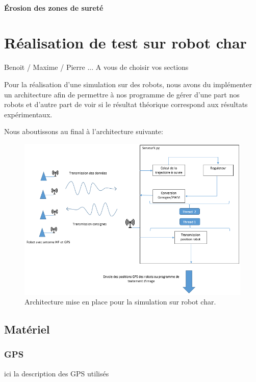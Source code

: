 \documentclass[10pt,a4paper]{report}
\begin{document}
\subsubsection{Érosion des zones de sureté}


\chapter{Réalisation de test sur robot char}
Benoit / Maxime / Pierre ... A vous de choisir vos sections

Pour la réalisation d'une simulation sur des robots, nous avons du implémenter un architecture afin de permettre à nos programme de gérer d'une part nos robots et d'autre part de voir si le résultat théorique correspond aux résultats expérimentaux.

\medskip

Nous aboutissons au final à l'architecture suivante:

\bigskip

\begin{figure}[ht]
\centering
    \includegraphics[scale=0.8,angle=0]{SyntheseExp.png}
    \caption{Architecture mise en place pour la simulation sur robot char.}
    \label{fig:SyntheseExp}
\end{figure}

\bigskip

\section{Matériel}
\subsection{GPS}
ici la description des GPS utilisés
\end{document}
